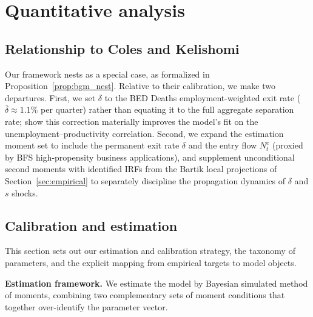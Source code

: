 \documentclass[authoryear, review, 12pt]{elsarticle}
\begin{document}
	\section{Quantitative analysis}\label{sec:quantitative}
	\subsection{Relationship to Coles and Kelishomi}\label{sec:ck_comparison}

	Our framework nests \citet{coles_2018} as a special case, as formalized in
	Proposition~\ref{prop:bgm_nest}. Relative to their calibration, we make two
	departures. First, we set $\delta$ to the BED Deaths employment-weighted exit rate
	($\bar\delta \approx 1.1\%$ per quarter) rather than equating it to the full
	aggregate separation rate; \citet{gabrovski_2025} show this correction materially
	improves the model's fit on the unemployment--productivity correlation. Second, we
	expand the estimation moment set to include the permanent exit rate $\delta$ and
	the entry flow $N^e_t$ (proxied by BFS high-propensity business applications), and supplement unconditional second moments with
	identified IRFs from the Bartik local projections of Section~\ref{sec:empirical}
	to separately discipline the propagation dynamics of $\delta$ and $s$ shocks.

	\subsection{Calibration and estimation}\label{sec:calib}

	This section sets out our estimation and calibration strategy, the taxonomy of
	parameters, and the explicit mapping from empirical targets to model objects.

	\medskip\noindent\textbf{Estimation framework.}
	We estimate the model by Bayesian simulated method of moments, combining two
	complementary sets of moment conditions that together over-identify the parameter
	vector.
\end{document}
